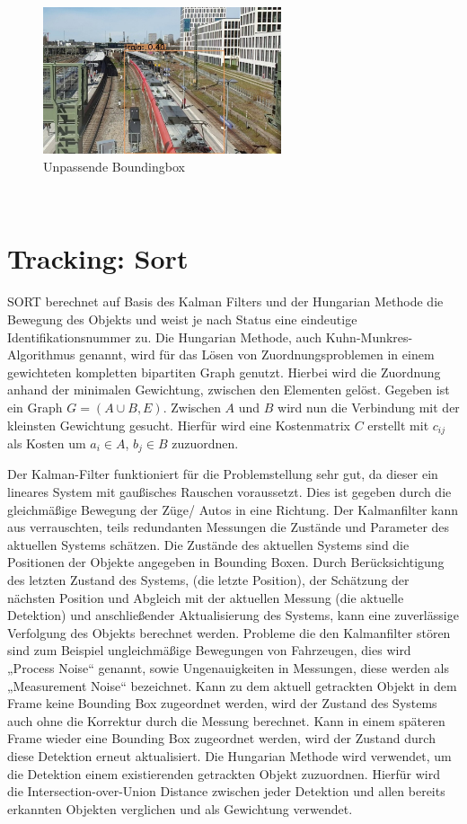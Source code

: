 \documentclass[conference]{IEEEtran}
\begin{document}
	\begin{figure}[!h]
		\begin{center}
			\includegraphics[width=7cm]{Media/Output_2126.jpg}
			\caption{Unpassende Boundingbox}
			\label{UB4}
		\end{center}
	\end{figure}\\

	
	\section{Tracking: Sort}
	SORT berechnet auf Basis des Kalman Filters und der Hungarian Methode die Bewegung des Objekts und weist je nach Status eine eindeutige Identifikationsnummer zu. Die Hungarian Methode, auch Kuhn-Munkres-Algorithmus genannt, wird für das Lösen von Zuordnungsproblemen in einem gewichteten kompletten bipartiten Graph genutzt. Hierbei wird die Zuordnung anhand der minimalen Gewichtung, zwischen den Elementen gelöst. Gegeben ist ein Graph $G = (A \cup B, E) $. Zwischen $A$ und $B$ wird nun die Verbindung mit der kleinsten Gewichtung gesucht. Hierfür wird eine Kostenmatrix $C$ erstellt mit $c_{ij}$ als Kosten um $a_i \in A$, $b_j \in B$ zuzuordnen. 
	
	Der Kalman-Filter funktioniert für die Problemstellung sehr gut, da dieser ein lineares System mit gaußisches Rauschen voraussetzt. Dies ist gegeben durch die gleichmäßige Bewegung der Züge/ Autos in eine Richtung.
	Der Kalmanfilter kann aus verrauschten, teils redundanten Messungen die Zustände und Parameter des aktuellen Systems schätzen. 
	Die Zustände des aktuellen Systems sind die Positionen der Objekte angegeben in Bounding Boxen. Durch Berücksichtigung des letzten Zustand des Systems, (die letzte Position), der Schätzung der nächsten Position und Abgleich mit der aktuellen Messung (die aktuelle Detektion) und anschließender Aktualisierung des Systems, kann eine zuverlässige Verfolgung des Objekts berechnet werden. Probleme die den Kalmanfilter stören sind zum Beispiel ungleichmäßige Bewegungen von Fahrzeugen, dies wird „Process Noise“ genannt, sowie Ungenauigkeiten in Messungen, diese werden als „Measurement Noise“ bezeichnet.
	Kann zu dem aktuell getrackten Objekt in dem Frame keine Bounding Box zugeordnet werden, wird der Zustand des Systems auch ohne die Korrektur durch die Messung berechnet. Kann in einem späteren Frame wieder eine Bounding Box zugeordnet werden, wird der Zustand durch diese Detektion erneut aktualisiert. 
	Die Hungarian Methode wird verwendet, um die Detektion einem existierenden getrackten Objekt zuzuordnen. Hierfür wird die Intersection-over-Union Distance zwischen jeder Detektion und allen bereits erkannten Objekten verglichen und als Gewichtung verwendet.
	
\end{document}
